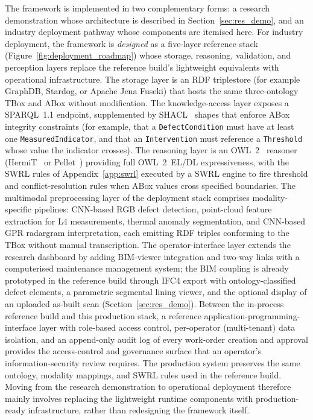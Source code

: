 \documentclass[11pt,a4paper]{article}
\begin{document}
The framework is implemented in two complementary forms: a research demonstration whose architecture is described in Section~\ref{sec:res_demo}, and an industry deployment pathway whose components are itemised here. For industry deployment, the framework is \emph{designed} as a five-layer reference stack (Figure~\ref{fig:deployment_roadmap}) whose storage, reasoning, validation, and perception layers replace the reference build's lightweight equivalents with operational infrastructure. The storage layer is an RDF triplestore (for example GraphDB, Stardog, or Apache Jena Fuseki) that hosts the same three-ontology TBox and ABox without modification. The knowledge-access layer exposes a SPARQL~1.1 endpoint, supplemented by SHACL~\citep{w3c2017shacl} shapes that enforce ABox integrity constraints (for example, that a \texttt{DefectCondition} must have at least one \texttt{MeasuredIndicator}, and that an \texttt{Intervention} must reference a \texttt{Threshold} whose value the indicator crosses). The reasoning layer is an OWL~2~\citep{w3c2012owl2} reasoner (HermiT~\citep{glimm2014hermit} or Pellet~\citep{sirin2007pellet}) providing full OWL~2~EL/DL expressiveness, with the SWRL rules of Appendix~\ref{app:swrl} executed by a SWRL engine to fire threshold and conflict-resolution rules when ABox values cross specified boundaries. The multimodal preprocessing layer of the deployment stack comprises modality-specific pipelines: CNN-based RGB defect detection, point-cloud feature extraction for L4 measurements, thermal anomaly segmentation, and CNN-based GPR radargram interpretation, each emitting RDF triples conforming to the TBox without manual transcription. The operator-interface layer extends the research dashboard by adding BIM-viewer integration and two-way links with a computerised maintenance management system; the BIM coupling is already prototyped in the reference build through IFC4 export with ontology-classified defect elements, a parametric segmental lining viewer, and the optional display of an uploaded as-built scan (Section~\ref{sec:res_demo}). Between the in-process reference build and this production stack, a reference application-programming-interface layer with role-based access control, per-operator (multi-tenant) data isolation, and an append-only audit log of every work-order creation and approval provides the access-control and governance surface that an operator's information-security review requires. The production system preserves the same ontology, modality mappings, and SWRL rules used in the reference build. Moving from the research demonstration to operational deployment therefore mainly involves replacing the lightweight runtime components with production-ready infrastructure, rather than redesigning the framework itself.
\end{document}
